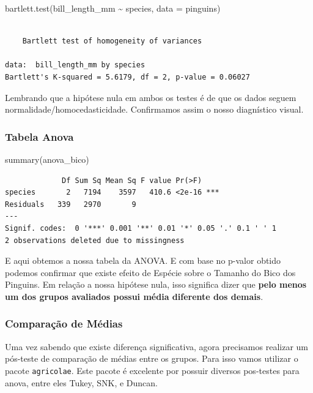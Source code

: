 \documentclass[
  letterpaper,
  DIV=11,
  numbers=noendperiod,
  oneside]{scrartcl}
\newenvironment{Shaded}{\begin{snugshade}}{\end{snugshade}}
\newcommand{\AttributeTok}[1]{\textcolor[rgb]{0.40,0.45,0.13}{#1}}
\newcommand{\FunctionTok}[1]{\textcolor[rgb]{0.28,0.35,0.67}{#1}}
\newcommand{\NormalTok}[1]{\textcolor[rgb]{0.00,0.23,0.31}{#1}}
\newcommand{\SpecialCharTok}[1]{\textcolor[rgb]{0.37,0.37,0.37}{#1}}
\begin{document}
\begin{Shaded}
\begin{Highlighting}[]
\FunctionTok{bartlett.test}\NormalTok{(bill\_length\_mm }\SpecialCharTok{\textasciitilde{}}\NormalTok{ species, }\AttributeTok{data =}\NormalTok{ pinguins)}
\end{Highlighting}
\end{Shaded}

\begin{verbatim}

    Bartlett test of homogeneity of variances

data:  bill_length_mm by species
Bartlett's K-squared = 5.6179, df = 2, p-value = 0.06027
\end{verbatim}

Lembrando que a hipótese nula em ambos os testes é de que os dados
seguem normalidade/homocedasticidade. Confirmamos assim o nosso
diagnístico visual.

\subsubsection{Tabela Anova}\label{tabela-anova}

\begin{Shaded}
\begin{Highlighting}[]
\FunctionTok{summary}\NormalTok{(anova\_bico)}
\end{Highlighting}
\end{Shaded}

\begin{verbatim}
             Df Sum Sq Mean Sq F value Pr(>F)    
species       2   7194    3597   410.6 <2e-16 ***
Residuals   339   2970       9                   
---
Signif. codes:  0 '***' 0.001 '**' 0.01 '*' 0.05 '.' 0.1 ' ' 1
2 observations deleted due to missingness
\end{verbatim}

E aqui obtemos a nossa tabela da ANOVA. E com base no p-valor obtido
podemos confirmar que existe efeito de Espécie sobre o Tamanho do Bico
dos Pinguins. Em relação a nossa hipótese nula, isso significa dizer que
\textbf{pelo menos um dos grupos avaliados possui média diferente dos
demais}.

\subsubsection{Comparação de
Médias}\label{comparauxe7uxe3o-de-muxe9dias}

Uma vez sabendo que existe diferença significativa, agora precisamos
realizar um pós-teste de comparação de médias entre os grupos. Para isso
vamos utilizar o pacote \texttt{agricolae}. Este pacote é excelente por
possuir diversos pos-testes para anova, entre eles Tukey, SNK, e Duncan.
\end{document}
